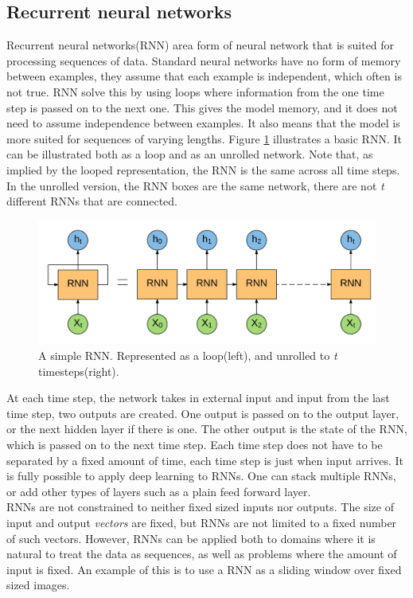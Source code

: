 \subsection{Recurrent neural networks}
Recurrent neural networks(RNN) area form of neural network that is suited for processing sequences of data. Standard neural networks have no form of memory between examples, they assume that each example is independent, which often is not true. RNN solve this by using loops where information from the one time step is passed on to the next one. This gives the model memory, and it does not need to assume independence between examples. It also means that the model is more suited for sequences of varying lengths. Figure \ref{fig:rnn} illustrates a basic RNN. It can be illustrated both as a loop and as an unrolled network. Note that, as implied by the looped representation, the RNN is the same across all time steps. In the unrolled version, the RNN boxes are the same network, there are not \textit{t} different RNNs that are connected.\\

\begin{figure}[htp]
	\centering
	\includegraphics[width=1.0\textwidth]{fig/rnn.png}
	\caption{A simple RNN. Represented as a loop(left), and unrolled to \textit{t} timesteps(right).}
	\label{fig:rnn}
\end{figure}

At each time step, the network takes in external input and input from the last time step, two outputs are created. One output is passed on to the output layer, or the next hidden layer if there is one. The other output is the state of the RNN, which is passed on to the next time step. Each time step does not have to be separated by a fixed amount of time, each time step is just when input arrives. It is fully possible to apply deep learning to RNNs. One can stack multiple RNNs, or add other types of layers such as a plain feed forward layer.\\

RNNs are not constrained to neither fixed sized inputs nor outputs. The size of input and output \textit{vectors} are fixed, but RNNs are not limited to a fixed number of such vectors. However, RNNs can be applied both to domains where it is natural to treat the data as sequences, as well as problems where the amount of input is fixed. An example of this is to use a RNN as a sliding window over fixed sized images.



